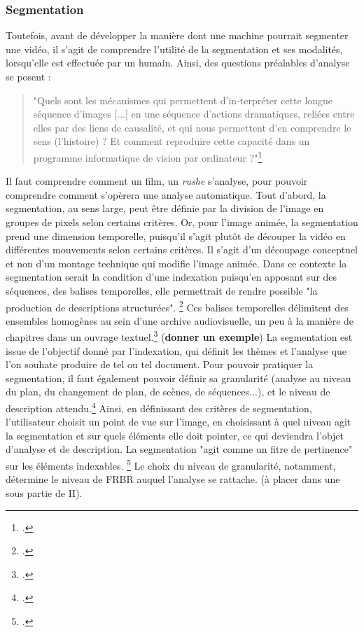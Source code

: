 \subsubsection{Segmentation}

Toutefois, avant de développer la manière dont une machine pourrait segmenter une vidéo, il s'agit de comprendre l'utilité de la segmentation et ses modalités, lorsqu'elle est effectuée par un humain. 
Ainsi, des questions préalables d'analyse se posent : 
\begin{quote}
	"Quels sont les mécanismes qui permettent d’in-terpréter cette longue séquence d’images [...] en une séquence d’actions dramatiques, reliées entre elles par des liens de causalité, et qui nous permettent d’en comprendre le sens (l’histoire) ? Et comment reproduire cette capacité dans un programme informatique de vision par ordinateur ?"\footcite{zotero-item-644}
\end{quote}
Il faut comprendre comment un film, un \textit{rushe} s'analyse, pour pouvoir comprendre comment s'opèrera une analyse automatique. 
Tout d'abord, la segmentation, au sens large, peut être définie par la division de l'image en groupes de pixels selon certains critères. Or, pour l'image animée, la segmentation prend une dimension temporelle, puisqu'il s'agit plutôt de découper la vidéo en différentes mouvements selon certains critères. Il s'agit d'un découpage conceptuel et non d'un montage technique qui modifie l'image animée. Dans ce contexte la segmentation serait la condition d'une indexation puisqu'en apposant sur des séquences, des balises temporelles, elle permettrait de rendre possible "la production de descriptions structurées". \footcite{stockinger2011} Ces balises temporelles délimitent des ensembles homogènes au sein d'une archive audiovisuelle, un peu à la manière de chapitres dans un ouvrage textuel.\footcite{stockinger2011} (\textbf{donner un exemple})
La segmentation est issue de l'objectif donné par l'indexation, qui définit les thèmes et l'analyse que l'on souhate produire de tel ou tel document. Pour pouvoir pratiquer la segmentation, il faut également pouvoir définir sa granularité (analyse au niveau du plan, du changement de plan, de scènes, de séquences...), et le niveau de description attendu.\footcite{stockinger2011} Ainsi, en définissant des critères de segmentation, l'utilisateur choisit un point de vue sur l'image, en choisissant à quel niveau agit la segmentation et sur quels éléments elle doit pointer, ce qui deviendra l'objet d'analyse et de description. La segmentation "agit comme un fitre de pertinence" sur les éléments indexables. \footcite{stockinger2011} Le choix du niveau de granularité, notamment, détermine le niveau de FRBR auquel l'analyse se rattache. (à placer dans une sous partie de II).
